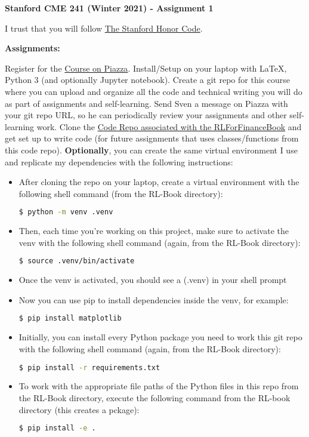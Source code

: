 \documentclass[12pt]{exam}
\begin{document}
\begin{center}
{\large {\bf Stanford CME 241 (Winter 2021) - Assignment 1}}
\end{center}

I trust that you will follow \href{https://communitystandards.stanford.edu/policies-and-guidance/honor-code}{The Stanford Honor Code}.
 
{\large{\bf Assignments:}}
\begin{questions}
\question Register for the \href{https://piazza.com/stanford/winter2021/cme241/home}{Course on Piazza}.
\question Install/Setup on your laptop with LaTeX, Python 3 (and optionally Jupyter notebook).
\question Create a git repo for this course where you can upload and organize all the code and technical writing you will do as part of assignments and self-learning.
\question Send Sven a message on Piazza with your git repo URL, so he can periodically review your assignments and other self-learning work.
\question Clone the \href{https://github.com/TikhonJelvis/RL-book}{Code Repo associated with the RLForFinanceBook} and get set up to write code (for future assignments that uses classes/functions from this code repo). {\bf Optionally}, you can create the same virtual environment I use and replicate my dependencies with the following instructions:
\begin{itemize}
\item After cloning the repo on your laptop, create a virtual environment with the following shell command (from the RL-Book directory):
\begin{lstlisting}[language=bash]
$ python -m venv .venv
\end{lstlisting}
\item Then, each time you're working on this project, make sure to activate the venv with the following shell command (again, from the RL-Book directory):
\begin{lstlisting}[language=bash]
$ source .venv/bin/activate
\end{lstlisting}
\item Once the venv is activated, you should see a (.venv) in your shell prompt
\item Now you can use pip to install dependencies inside the venv, for example:
\begin{lstlisting}[language=bash]
$ pip install matplotlib
\end{lstlisting}
\item Initially, you can install every Python package you need to work this git repo with the following shell command (again, from the RL-Book directory):
\begin{lstlisting}[language=bash]
$ pip install -r requirements.txt
\end{lstlisting}
\item To work with the appropriate file paths of the Python files in this repo from the RL-Book directory, execute the following command from the RL-book directory (this creates a pckage):
\begin{lstlisting}[language=bash]
$ pip install -e .
\end{lstlisting}
\end{itemize}
\end{questions}
\end{document}

